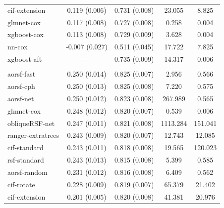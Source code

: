 \documentclass{article}\usepackage[]{graphicx}\usepackage[]{xcolor}
\newenvironment{knitrout}{}{} %
\begin{document}
\begin{knitrout}
\begin{longtable}[t]{lcccc}
\hspace{1em}cif-extension & 0.119 (0.006) & 0.731 (0.008) & 23.055 & 8.825\\
\hspace{1em}glmnet-cox & 0.117 (0.008) & 0.727 (0.008) & 0.258 & 0.004\\
\hspace{1em}xgboost-cox & 0.113 (0.008) & 0.729 (0.009) & 3.628 & 0.004\\
\hspace{1em}nn-cox & -0.007 (0.027) & 0.511 (0.045) & 17.722 & 7.825\\
\hspace{1em}xgboost-aft & --- & 0.735 (0.009) & 14.317 & 0.006\\
\addlinespace[0.3em]
\multicolumn{5}{l}{\textit{\textbf{Serum free light chain; death, n = 7874, p = 10}}}\\
\hline
\hspace{1em}aorsf-fast & 0.250 (0.014) & 0.825 (0.007) & 2.956 & 0.566\\
\hspace{1em}aorsf-cph & 0.250 (0.013) & 0.825 (0.008) & 7.220 & 0.575\\
\hspace{1em}aorsf-net & 0.250 (0.012) & 0.823 (0.008) & 267.989 & 0.565\\
\hspace{1em}glmnet-cox & 0.248 (0.012) & 0.820 (0.007) & 0.539 & 0.006\\
\hspace{1em}obliqueRSF-net & 0.247 (0.011) & 0.821 (0.008) & 1113.284 & 151.041\\
\hspace{1em}ranger-extratrees & 0.243 (0.009) & 0.820 (0.007) & 12.743 & 12.085\\
\hspace{1em}cif-standard & 0.243 (0.011) & 0.818 (0.008) & 19.565 & 120.023\\
\hspace{1em}rsf-standard & 0.243 (0.013) & 0.815 (0.008) & 5.399 & 0.585\\
\hspace{1em}aorsf-random & 0.231 (0.012) & 0.816 (0.008) & 6.409 & 0.562\\
\hspace{1em}cif-rotate & 0.228 (0.009) & 0.819 (0.007) & 65.379 & 21.402\\
\hspace{1em}cif-extension & 0.201 (0.005) & 0.820 (0.008) & 41.381 & 20.976\\

\end{longtable}
\end{knitrout}
\end{document}
